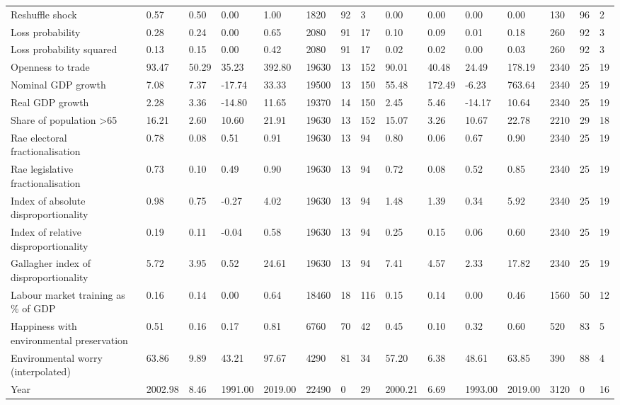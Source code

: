 \begin{longtable}{lllllllllllllll}
Reshuffle shock & 0.57 & 0.50 & 0.00 & 1.00 & 1820 & 92 & 3 & 0.00 & 0.00 & 0.00 & 0.00 & 130 & 96 & 2\\
Loss probability & 0.28 & 0.24 & 0.00 & 0.65 & 2080 & 91 & 17 & 0.10 & 0.09 & 0.01 & 0.18 & 260 & 92 & 3\\
\addlinespace
Loss probability squared & 0.13 & 0.15 & 0.00 & 0.42 & 2080 & 91 & 17 & 0.02 & 0.02 & 0.00 & 0.03 & 260 & 92 & 3\\
Openness to trade & 93.47 & 50.29 & 35.23 & 392.80 & 19630 & 13 & 152 & 90.01 & 40.48 & 24.49 & 178.19 & 2340 & 25 & 19\\
Nominal GDP growth & 7.08 & 7.37 & -17.74 & 33.33 & 19500 & 13 & 150 & 55.48 & 172.49 & -6.23 & 763.64 & 2340 & 25 & 19\\
Real GDP growth & 2.28 & 3.36 & -14.80 & 11.65 & 19370 & 14 & 150 & 2.45 & 5.46 & -14.17 & 10.64 & 2340 & 25 & 19\\
Share of population >65 & 16.21 & 2.60 & 10.60 & 21.91 & 19630 & 13 & 152 & 15.07 & 3.26 & 10.67 & 22.78 & 2210 & 29 & 18\\
\addlinespace
Rae electoral fractionalisation & 0.78 & 0.08 & 0.51 & 0.91 & 19630 & 13 & 94 & 0.80 & 0.06 & 0.67 & 0.90 & 2340 & 25 & 19\\
Rae legislative fractionalisation & 0.73 & 0.10 & 0.49 & 0.90 & 19630 & 13 & 94 & 0.72 & 0.08 & 0.52 & 0.85 & 2340 & 25 & 19\\
Index of absolute disproportionality & 0.98 & 0.75 & -0.27 & 4.02 & 19630 & 13 & 94 & 1.48 & 1.39 & 0.34 & 5.92 & 2340 & 25 & 19\\
Index of relative disproportionality & 0.19 & 0.11 & -0.04 & 0.58 & 19630 & 13 & 94 & 0.25 & 0.15 & 0.06 & 0.60 & 2340 & 25 & 19\\
Gallagher index of disproportionality & 5.72 & 3.95 & 0.52 & 24.61 & 19630 & 13 & 94 & 7.41 & 4.57 & 2.33 & 17.82 & 2340 & 25 & 19\\
\addlinespace
Labour market training as \% of GDP & 0.16 & 0.14 & 0.00 & 0.64 & 18460 & 18 & 116 & 0.15 & 0.14 & 0.00 & 0.46 & 1560 & 50 & 12\\
Happiness with environmental preservation & 0.51 & 0.16 & 0.17 & 0.81 & 6760 & 70 & 42 & 0.45 & 0.10 & 0.32 & 0.60 & 520 & 83 & 5\\
Environmental worry (interpolated) & 63.86 & 9.89 & 43.21 & 97.67 & 4290 & 81 & 34 & 57.20 & 6.38 & 48.61 & 63.85 & 390 & 88 & 4\\
Year & 2002.98 & 8.46 & 1991.00 & 2019.00 & 22490 & 0 & 29 & 2000.21 & 6.69 & 1993.00 & 2019.00 & 3120 & 0 & 16\\
\bottomrule
\end{longtable}

